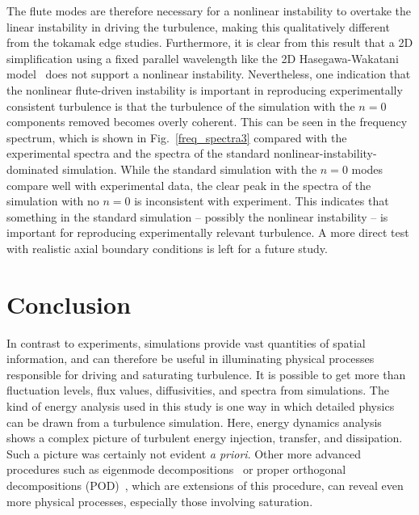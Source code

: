 \documentclass[showpacs,preprintnumbers,amsmath,amssymb,superscriptaddress]{revtex4}
\begin{document}
The flute modes are therefore necessary for a nonlinear instability to overtake the linear instability in driving the turbulence, making this qualitatively different from the
tokamak edge studies. Furthermore, it is clear from this result that a 2D simplification
using a fixed parallel wavelength like the 2D Hasegawa-Wakatani model~\cite{hasegawa1983} does not support a nonlinear instability.
Nevertheless, one indication that the nonlinear flute-driven instability is important in reproducing experimentally consistent turbulence 
is that the turbulence of the simulation with the $n=0$ components removed becomes overly coherent. This can be seen in the
frequency spectrum, which is shown in
Fig.~\ref{freq_spectra3} compared with the experimental spectra and
the spectra of the standard nonlinear-instability-dominated
simulation. While the standard simulation with the $n=0$ modes compare
well with experimental data, 
the clear peak in the spectra of the simulation with no $n=0$ is
inconsistent with experiment.  This indicates that something in the standard simulation -- possibly
the nonlinear instability -- is important for reproducing experimentally relevant turbulence. A more direct test with realistic axial boundary conditions is left for a future study.


\section{Conclusion}

In contrast to experiments, simulations provide vast quantities of spatial information, and can therefore be useful in illuminating physical processes responsible for driving and saturating
turbulence. It is possible to get more than fluctuation levels, flux values, diffusivities, and spectra from simulations. The kind of energy analysis used in this study is one 
way in which detailed physics can be drawn from a turbulence simulation. Here, energy dynamics analysis shows a complex picture of turbulent energy injection, transfer, and dissipation. 
Such a picture was certainly not evident \emph{a priori}.
Other more advanced procedures such as eigenmode decompositions~\cite{baver2002} or proper orthogonal decompositions (POD)~\cite{hatch2011}, which are extensions of this procedure,
can reveal even more physical processes, especially those involving saturation. 
\end{document}
